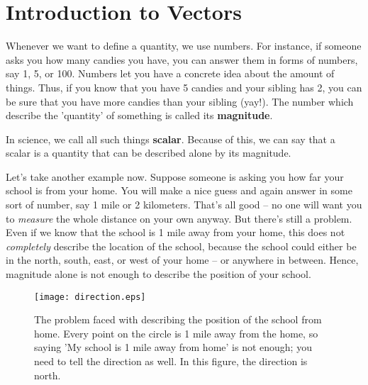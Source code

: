 \chapter{Introduction to Vectors}

{
\begin{center}
\end{center}
}

Whenever we want to define a quantity, we use numbers. For instance, if someone asks you how many candies you have, you can answer them in forms of numbers, say 1, 5, or 100. Numbers let you have a concrete idea about the amount of things. Thus, if you know that you have 5 candies and your sibling has 2, you can be sure that you have more candies than your sibling (yay!). The number which describe the 'quantity' of something is called its \textbf{magnitude}.

In science, we call all such things \textbf{scalar}. Because of this, we can say that a scalar is a quantity that can be described alone by its magnitude.

Let's take another example now. Suppose someone is asking you how far your school is from your home. You will make a nice guess and again answer in some sort of number, say 1 mile or 2 kilometers. That's all good -- no one will want you to \textit{measure} the whole distance on your own anyway. But there's still a problem. Even if we know that the school is 1 mile away from your home, this does not \textit{completely} describe the location of the school, because the school could either be in the north, south, east, or west of your home -- or anywhere in between. Hence, magnitude alone is not enough to describe the position of your school.

\begin{figure}[ht!]
    \centering
    \texttt{[image: direction.eps]}
    \caption{The problem faced with describing the position of the school from home. Every point on the circle is 1 mile away from the home, so saying 'My school is 1 mile away from home' is not enough; you need to tell the direction as well. In this figure, the direction is north.}
    \label{fig:direction}
\end{figure}

